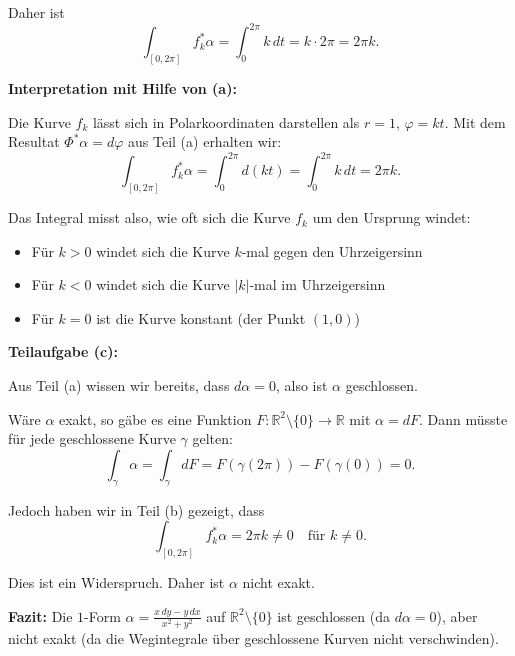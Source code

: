 \documentclass{article}
\newcommand{\R}{\mathbb{R}}
\begin{document}
Daher ist
$$\int_{[0,2\pi]} f_k^*\alpha = \int_0^{2\pi} k\,dt = k \cdot 2\pi = 2\pi k.$$

\textbf{Interpretation mit Hilfe von (a):}

Die Kurve $f_k$ lässt sich in Polarkoordinaten darstellen als $r = 1$, $\varphi = kt$. Mit dem Resultat $\Phi^*\alpha = d\varphi$ aus Teil (a) erhalten wir:
$$\int_{[0,2\pi]} f_k^*\alpha = \int_0^{2\pi} d(kt) = \int_0^{2\pi} k\,dt = 2\pi k.$$

Das Integral misst also, wie oft sich die Kurve $f_k$ um den Ursprung windet:
\begin{itemize}
\item Für $k > 0$ windet sich die Kurve $k$-mal gegen den Uhrzeigersinn
\item Für $k < 0$ windet sich die Kurve $|k|$-mal im Uhrzeigersinn
\item Für $k = 0$ ist die Kurve konstant (der Punkt $(1,0)$)
\end{itemize}

\textbf{Teilaufgabe (c):}

Aus Teil (a) wissen wir bereits, dass $d\alpha = 0$, also ist $\alpha$ geschlossen.

Wäre $\alpha$ exakt, so gäbe es eine Funktion $F: \R^2 \setminus \{0\} \to \R$ mit $\alpha = dF$. Dann müsste für jede geschlossene Kurve $\gamma$ gelten:
$$\int_\gamma \alpha = \int_\gamma dF = F(\gamma(2\pi)) - F(\gamma(0)) = 0.$$

Jedoch haben wir in Teil (b) gezeigt, dass
$$\int_{[0,2\pi]} f_k^*\alpha = 2\pi k \neq 0 \quad \text{für } k \neq 0.$$

Dies ist ein Widerspruch. Daher ist $\alpha$ nicht exakt.

\textbf{Fazit:} Die $1$-Form $\alpha = \frac{x\,dy - y\,dx}{x^2+y^2}$ auf $\R^2 \setminus \{0\}$ ist geschlossen (da $d\alpha = 0$), aber nicht exakt (da die Wegintegrale über geschlossene Kurven nicht verschwinden).
\end{document}

